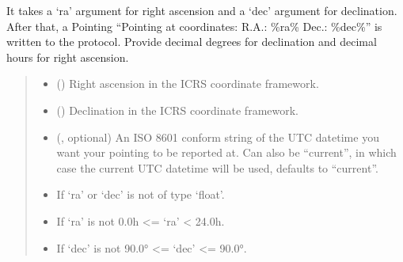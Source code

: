 \documentclass[letterpaper,10pt,english]{sphinxmanual}
\begin{document}
\begin{fulllineitems}
\begin{fulllineitems}
\sphinxAtStartPar
It takes a ‘ra’ argument for right ascension and a ‘dec’ argument for
declination. After that, a Pointing “Pointing at coordinates: R.A.:
\%ra\% Dec.: \%dec\%” is written to the protocol. Provide decimal degrees
for declination and decimal hours for right ascension.
\begin{quote}\begin{description}
\begin{itemize}
\item {} 
\sphinxAtStartPar
{} () \textendash{} Right ascension in the ICRS coordinate framework.

\item {} 
\sphinxAtStartPar
{} () \textendash{} Declination in the ICRS coordinate framework.

\item {} 
\sphinxAtStartPar
{} (, optional) \textendash{} An ISO 8601 conform string of the UTC datetime you want your
pointing to be reported at. Can also be “current”, in which case the
current UTC datetime will be used, defaults to “current”.

\end{itemize}

\begin{itemize}
\item {} 
\sphinxAtStartPar
{} \textendash{} If ‘ra’ or ‘dec’ is not of type ‘float’.

\item {} 
\sphinxAtStartPar
{} \textendash{} If ‘ra’ is not 0.0h \textless{}= ‘ra’ \textless{} 24.0h.

\item {} 
\sphinxAtStartPar
{} \textendash{} If ‘dec’ is not \sphinxhyphen{}90.0° \textless{}= ‘dec’ \textless{}= 90.0°.

\end{itemize}

\end{description}\end{quote}

\end{fulllineitems}


\end{fulllineitems}
\end{document}
